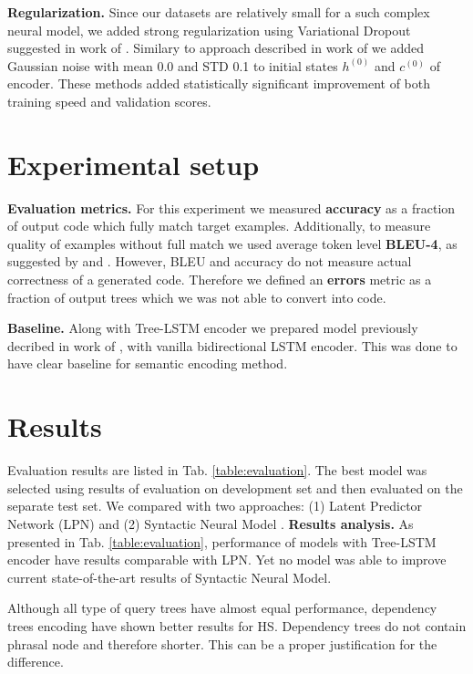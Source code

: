 \textbf{Regularization.} Since our datasets are relatively small for  a such complex neural model, we added strong regularization using Variational Dropout suggested in work of \cite{Gal2016}. Similary to approach described in work of \cite{zimmermann2012} we added Gaussian noise with mean 0.0 and STD 0.1 to initial states $h^{(0)}$ and $c^{(0)}$ of encoder. These methods added statistically significant improvement of both training speed and validation scores.

\section{Experimental setup} \label{exp_setup}

\textbf{Evaluation metrics.} For this experiment we measured \textbf{accuracy} as a fraction of output code which fully match target examples. Additionally, to measure quality of examples without full match we used average token level \textbf{BLEU-4}, as suggested by \cite{Ling2016} and \cite{Yin2017}. However, BLEU and accuracy do not measure actual correctness of a generated code. Therefore we defined an \textbf{errors} metric as a fraction of output trees which we was not able to convert into code.

\textbf{Baseline.} Along with Tree-LSTM encoder we prepared model previously decribed in work of \cite{Yin2017}, with vanilla bidirectional LSTM encoder. This was done to have clear baseline for semantic encoding method. 

\section{Results}
Evaluation results are listed in Tab. \ref{table:evaluation}. The best model was selected using results of evaluation on development set and then evaluated on the separate test set. We compared with two approaches: (1) Latent Predictor Network (LPN) \parencite{Ling2016} and (2) Syntactic Neural Model \parencite{Yin2017}. 
\textbf{Results analysis.} As presented in Tab. \ref{table:evaluation}, performance of models with Tree-LSTM encoder have results comparable with LPN. Yet no model was able to improve current state-of-the-art results of Syntactic Neural Model. 

Although all type of query trees have almost equal performance, dependency trees encoding have shown better results for HS. Dependency trees do not contain phrasal node and therefore shorter. This can be a proper justification for the difference.

